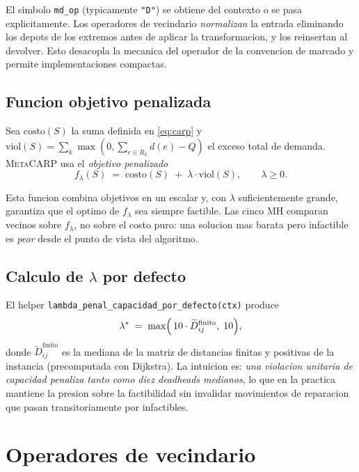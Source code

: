 \documentclass[11pt,a4paper]{article}
\newcommand{\mh}{MH}
\newcommand{\op}[1]{\texttt{#1}}
\newcommand{\code}[1]{\texttt{#1}}
\begin{document}
El simbolo \code{md\_op} (typicamente \op{"D"}) se obtiene del
contexto o se pasa explicitamente. Los operadores de vecindario
\emph{normalizan} la entrada eliminando los depots de los extremos
antes de aplicar la transformacion, y los reinsertan al devolver. Esto
desacopla la mecanica del operador de la convencion de marcado y
permite implementaciones compactas.

\subsection{Funcion objetivo penalizada}\label{sec:objetivo}

Sea $\text{costo}(S)$ la suma definida en \eqref{eq:carp} y
$\text{viol}(S) = \sum_k \max(0,\sum_{e\in R_k} d(e) - Q)$ el exceso
total de demanda. \textsc{MetaCARP} usa el \emph{objetivo penalizado}
\begin{equation}\label{eq:objetivo}
f_\lambda(S) \;=\; \text{costo}(S) \;+\; \lambda \cdot \text{viol}(S),
\qquad \lambda \ge 0.
\end{equation}

Esta funcion combina objetivos en un escalar y, con $\lambda$
suficientemente grande, garantiza que el optimo de
$f_\lambda$ sea siempre factible. Las cinco \mh{} comparan vecinos
sobre $f_\lambda$, no sobre el costo puro: una solucion mas barata
pero infactible es \emph{peor} desde el punto de vista del
algoritmo.

\subsection{Calculo de $\lambda$ por defecto}\label{sec:lambda}

El helper \code{lambda\_penal\_capacidad\_por\_defecto(ctx)} produce
\begin{equation}\label{eq:lambda}
\lambda^* \;=\; \max\Bigl(\,10\cdot \widetilde{D}_{ij}^{\text{finito}},\;
10\Bigr),
\end{equation}
donde $\widetilde{D}_{ij}^{\text{finito}}$ es la mediana de la matriz
de distancias finitas y positivas de la instancia (precomputada con
Dijkstra). La intuicion es: \emph{una violacion unitaria de capacidad
penaliza tanto como diez deadheads medianos}, lo que en la practica
mantiene la presion sobre la factibilidad sin invalidar movimientos
de reparacion que pasan transitoriamente por infactibles.

\section{Operadores de vecindario}\label{sec:operadores}
\end{document}
